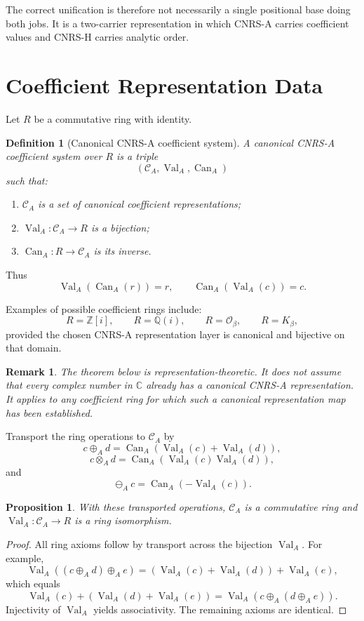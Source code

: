 \documentclass[11pt]{article}
\newtheorem{proposition}[theorem]{Proposition}
\newtheorem{definition}[theorem]{Definition}
\newtheorem{remark}[theorem]{Remark}
\newcommand{\Z}{\mathbb Z}
\newcommand{\Q}{\mathbb Q}
\newcommand{\C}{\mathbb C}
\newcommand{\Zi}{\Z[i]}
\newcommand{\Qi}{\Q(i)}
\newcommand{\CA}{\mathcal C_A}
\newcommand{\Val}{\operatorname{Val}_A}
\newcommand{\Can}{\operatorname{Can}_A}
\begin{document}
The correct unification is therefore not necessarily a single positional base doing both jobs.  It is a two-carrier representation in which CNRS-A carries coefficient values and CNRS-H carries analytic order.

\section{Coefficient Representation Data}

Let $R$ be a commutative ring with identity.

\begin{definition}[Canonical CNRS-A coefficient system]
A canonical CNRS-A coefficient system over $R$ is a triple
\[
(\CA,\Val,\Can)
\]
such that:
\begin{enumerate}[label=(\alph*)]
\item $\CA$ is a set of canonical coefficient representations;
\item $\Val:\CA\to R$ is a bijection;
\item $\Can:R\to\CA$ is its inverse.
\end{enumerate}
\end{definition}

Thus
\[
\Val(\Can(r))=r,\qquad
\Can(\Val(c))=c.
\]

Examples of possible coefficient rings include:
\[
R=\Zi,\qquad R=\Qi,\qquad R=\mathcal O_\beta,\qquad R=K_\beta,
\]
provided the chosen CNRS-A representation layer is canonical and bijective on that domain.

\begin{remark}
The theorem below is representation-theoretic.  It does not assume that every complex number in $\C$ already has a canonical CNRS-A representation.  It applies to any coefficient ring for which such a canonical representation map has been established.
\end{remark}

Transport the ring operations to $\CA$ by
\[
c\oplus_A d
=
\Can(\Val(c)+\Val(d)),
\]
\[
c\otimes_A d
=
\Can(\Val(c)\Val(d)),
\]
and
\[
\ominus_A c
=
\Can(-\Val(c)).
\]

\begin{proposition}
With these transported operations, $\CA$ is a commutative ring and $\Val:\CA\to R$ is a ring isomorphism.
\end{proposition}

\begin{proof}
All ring axioms follow by transport across the bijection $\Val$.  For example,
\[
\Val((c\oplus_A d)\oplus_A e)
=
(\Val(c)+\Val(d))+\Val(e),
\]
which equals
\[
\Val(c)+(\Val(d)+\Val(e))
=
\Val(c\oplus_A(d\oplus_A e)).
\]
Injectivity of $\Val$ yields associativity.  The remaining axioms are identical.
\end{proof}
\end{document}
